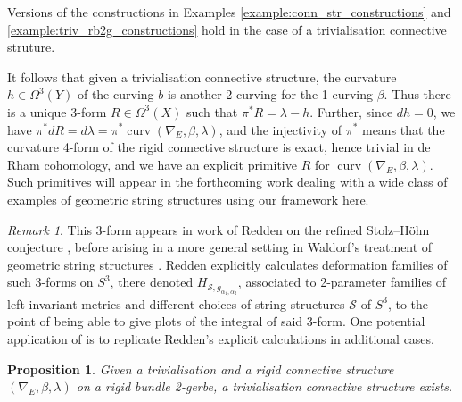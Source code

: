 \documentclass[12pt]{amsart}
\theoremstyle{plain}
\newtheorem{proposition}[theorem]{Proposition}
\theoremstyle{definition}
\theoremstyle{remark}
\newtheorem{remark}[theorem]{Remark}
\numberwithin{equation}{section}
\DeclareMathOperator{\curv}{curv}
\newcommand{\<}{\langle}
\renewcommand{\>}{\rangle}
\begin{document}
Versions of the constructions in Examples \ref{example:conn_str_constructions} and \ref{example:triv_rb2g_constructions} hold in the case of a trivialisation connective struture.

It follows that given a trivialisation connective structure, the curvature $h\in \Omega^3(Y)$ of the curving $b$ is another 2-curving for the 1-curving $\beta$. 
Thus there is a unique 3-form $R\in \Omega^3(X)$ such that $\pi^*R = \lambda - h$. 
Further, since $dh=0$, we have $\pi^*dR = d\lambda = \pi^*\curv(\nabla_E,\beta,\lambda)$, and the injectivity of $\pi^*$ means that the curvature 4-form of the rigid connective structure is exact, hence trivial in de Rham cohomology, and we have an explicit primitive $R$ for $\curv(\nabla_E,\beta,\lambda)$.
Such primitives will appear in the forthcoming work \cite{rb2g_III} dealing with a wide class of examples of geometric string structures using our framework here.


\begin{remark}\label{rem:Redden_3-form}
This 3-form appears in work of Redden on the refined Stolz--H\"ohn conjecture \cite[\S 3]{Redden}, before arising in a more general setting in Waldorf's treatment of geometric string structures \cite[Lemma 4.6]{Wal}. 
Redden explicitly calculates deformation families of such 3-forms on $S^3$, there denoted $H_{\mathscr{S},g_{\alpha_1,\alpha_2}}$, associated to 2-parameter families of left-invariant metrics and different choices of string structures $\mathscr{S}$ of $S^3$, to the point of being able to give plots of the integral of said 3-form.
One potential application of \cite{rb2g_III} is to replicate Redden's explicit calculations in additional cases.
\end{remark}


\begin{proposition}
Given a trivialisation and a rigid connective structure $(\nabla_E,\beta,\lambda)$ on a rigid bundle 2-gerbe, a trivialisation connective structure exists.
\end{proposition}
\end{document}
